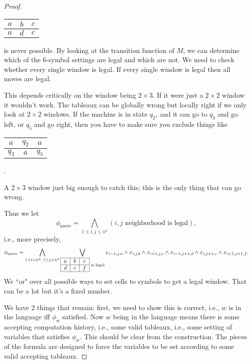 \begin{proof}
\begin{center}
\begin{tabular}{|c|c|c|}
\hline 
$a$ & $b$ & $c$\tabularnewline
\hline 
$a$ & $d$ & $c$\tabularnewline
\hline 
\end{tabular}
\end{center}
is never possible.
By looking at the transition function of $M$, we can determine which of the 6-symbol settings are legal and which are not.
We need to check whether every single window is legal. If every single window is legal then all moves are legal. 

This depends critically on the window being $2\times 3$. If it were just a $2\times 2$ window it wouldn't work. The tableaux can be globally wrong but locally right if we only look at $2\times 2$ windows. If the machine is in state $q_2$, and it can go to $q_3$ and go left, or $q_5$ and go right, then you have to make sure you exclude things like
\begin{center}
\begin{tabular}{|c|c|c|}
\hline 
$a$ & $q_{2}$ & $a$\tabularnewline
\hline 
$q_{3}$ & $a$ & $q_{5}$\tabularnewline
\hline 
\end{tabular}.
\end{center}
A $2\times 3$ window just big enough to catch this; this is the only thing that can go wrong.

Thus we let
\[
\phi_{\text{move}} = \bigwedge_{1\le i,j\le n^k} (i,j\text{ neighborhood is legal}),
\]
i.e., more precisely,
\[
\phi_{\text{move}} = \bigwedge_{1< i< n^k,\,1\le j<n^k}
\bigvee_{%
\begin{tabular}{|c|c|c|}
\hline 
$a$ & $b$ & $c$\tabularnewline
\hline 
$d$ & $e$ & $f$\tabularnewline
\hline 
\end{tabular} \text{ is legal}} x_{i-1,j,a}\wedge x_{i,j,b} \wedge x_{i+1,j,c}\wedge x_{i-1,j+1,d}\wedge x_{i,j+1,e}\wedge x_{i+1,j+1,f}.
\]
We ``or" over all possible ways to set cells to symbols to get a legal window. That can be a lot but it's a fixed number. %

We have 2 things that remain: first, we need to show this is correct, i.e., $w$ is in the language iff $\phi_w$ satisfied. Now $w$ being in the language means there is some accepting computation history, i.e., some valid tableaux, i.e., some setting of variables that satisfies $\phi_w$. This should be clear from the construction. The pieces of the formula are designed to force the variables to be set according to some valid accepting tableaux.


\end{proof}
